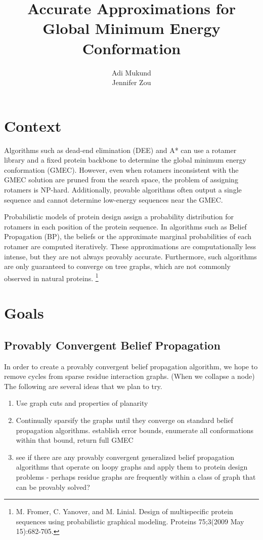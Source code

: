 \documentclass[11pt]{article}
\title{\textbf{Accurate Approximations for Global Minimum Energy Conformation}}
\author{Adi Mukund\\
		Jennifer Zou}
\date{}
\begin{document}
\maketitle

\section{Context}
\par Algorithms such as dead-end elimination (DEE) and A* can use a rotamer library and a fixed protein backbone to determine the global minimum energy conformation (GMEC).  However, even when rotamers inconsistent with the GMEC solution are pruned from the search space, the problem of assigning rotamers is NP-hard.  Additionally, provable algorithms often output a single sequence and cannot determine low-energy sequences near the GMEC.  

\par Probabilistic models of protein design assign a probability distribution for rotamers in each position of the protein sequence.  In algorithms such as Belief Propagation (BP), the beliefs or the approximate marginal probabilities of each rotamer are computed iteratively.  These approximations are computationally less intense, but they are not always provably accurate.  Furthermore, such algorithms are only guaranteed to converge on tree graphs, which are not commonly observed in natural proteins. \footnote{M. Fromer, C. Yanover, and M. Linial.  Design of multispecific protein sequences using probabilistic graphical modeling. Proteins 75;3(2009 May 15):682-705.}


\section{Goals}
\subsection{Provably Convergent Belief Propagation}
In order to create a provably convergent belief propagation algorithm, we hope to remove cycles from sparse residue interaction graphs. (When we collapse a node) The following are several ideas that we plan to try.
\begin{enumerate}[label=\roman*]
\item Use graph cuts and properties of planarity
\item Continually sparsify the graphs until they converge on standard belief propagation algorithms.  establish error bounds, enumerate all conformations within that bound, return full GMEC
\item see if there are any provably convergent generalized belief propagation algorithms that operate on loopy graphs and apply them to protein design problems - perhaps residue graphs are frequently within a class of graph that can be provably solved?
\end{enumerate}
\end{document}
